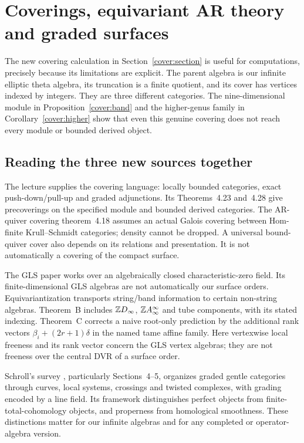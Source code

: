 \chapter{Coverings, equivariant AR theory and graded surfaces}
\label{cover:chapter}
The new covering calculation in Section~\ref{cover:section} is useful for
computations, precisely because its limitations are explicit. The parent
algebra is our infinite elliptic theta algebra, its truncation is a finite
quotient, and its cover has vertices indexed by integers. They are three
different categories. The nine-dimensional module in
Proposition~\ref{cover:band} and the higher-genus family in
Corollary~\ref{cover:higher} show that even this genuine covering does not
reach every module or bounded derived object.

\section{Reading the three new sources together}
The lecture \cite{CoveringLecture2026} supplies the covering language:
locally bounded categories, exact push-down/pull-up and graded adjunctions.
Its Theorems~4.23 and~4.28 give precoverings on the specified module and bounded
derived categories. The AR-quiver covering theorem~4.18 assumes an actual
Galois covering between Hom-finite Krull--Schmidt categories; density cannot
be dropped. A universal bound-quiver cover also depends on its relations and
presentation. It is not automatically a covering of the compact surface.

The GLS paper \cite{TameGLS2026} works over an algebraically closed
characteristic-zero field. Its finite-dimensional GLS algebras are not
automatically our surface orders. Equivariantization transports string/band
information to certain non-string algebras. Theorem~B includes
$\mathbb Z D_\infty$, $\mathbb Z A_\infty^\infty$ and tube components, with its stated
indexing. Theorem~C corrects a naive root-only prediction by the additional
rank vectors $\beta_i+(2r+1)\delta$ in the named tame affine family.
Here vertexwise local freeness and its rank vector concern the GLS vertex
algebras; they are not freeness over the central DVR of a surface order.

Schroll's survey \cite{SchrollGeometric2026}, particularly Sections~4--5,
organizes graded gentle categories through curves, local systems, crossings
and twisted complexes, with grading encoded by a line field. Its framework
distinguishes perfect objects from finite-total-cohomology objects, and
properness from homological smoothness. These distinctions matter for our
infinite algebras and for any completed or operator-algebra version.

